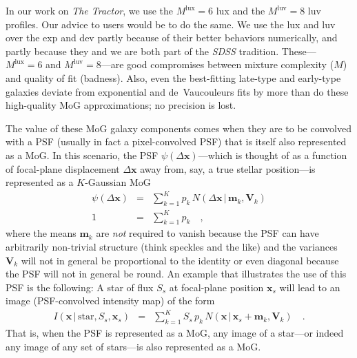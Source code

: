 \documentclass[12pt,pdftex,preprint]{aastex}
\newcommand{\project}[1]{\textsl{#1}}
\newcommand{\tmatrix}[1]{\boldsymbol{#1}}
\newcommand{\tvector}[1]{\boldsymbol{#1}}
\newcommand{\pos}{\tvector{x}}
\newcommand{\mean}{\tvector{m}}
\newcommand{\var}{\tmatrix{V}}
\newcommand{\normal}{N}
\newcommand{\given}{\,|\,}
\renewcommand{\star}{\mathrm{star}}
\newcommand{\lux}{\mathrm{lux}}
\newcommand{\luv}{\mathrm{luv}}
\begin{document}
In our work on \project{The Tractor}, we use the $M^{\lux}=6$ lux and
the $M^{\luv}=8$ luv profiles.  Our advice to users would be to do the
same.  We use the lux and luv over the exp and dev partly because of
their better behaviors numerically, and partly because they and we are
both part of the \project{SDSS} tradition.  These---$M^{\lux}=6$ and
$M^{\luv}=8$---are good compromises between mixture complexity ($M$)
and quality of fit (badness).  Also, even the best-fitting late-type
and early-type galaxies deviate from exponential and de~Vaucouleurs
fits by more than do these high-quality MoG approximations; no
precision is lost.

The value of these MoG galaxy components comes when they are to be
convolved with a PSF (usually in fact a pixel-convolved PSF) that is
itself also represented as a MoG.  In this scenario, the PSF
$\psi(\Delta\pos)$---which is thought of as a function of focal-plane
displacement $\Delta\pos$ away from, say, a true stellar position---is
represented as a $K$-Gaussian MoG
\begin{eqnarray}\displaystyle
\psi(\Delta\pos) &=& \sum_{k=1}^K p_k\,\normal(\Delta\pos\given\mean_k,\var_k)
\\
1 &=& \sum_{k=1}^K p_k
\quad ,
\end{eqnarray}
where the means $\mean_k$ are \emph{not} required to vanish because
the PSF can have arbitrarily non-trivial structure (think speckles and
the like) and the variances $\var_k$ will not in general be
proportional to the identity or even diagonal because the PSF will not
in general be round.  An example that illustrates the use of this PSF
is the following: A star of flux $S_s$ at focal-plane position
$\pos_s$ will lead to an image (PSF-convolved intensity map) of the
form
\begin{eqnarray}\displaystyle
I(\pos\given\star,S_s,\pos_s) &=& \sum_{k=1}^K S_s\,p_k\,\normal(\pos\given\pos_s+\mean_k,\var_k)
\quad .
\end{eqnarray}
That is, when the PSF is represented as a MoG, any image of a
star---or indeed any image of any set of stars---is also represented
as a MoG.
\end{document}
